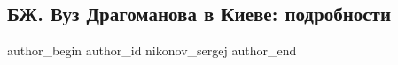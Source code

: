  
 
 
 
 
 
\subsection{БЖ. Вуз Драгоманова в Киеве: подробности}
\label{sec:12_09_2021.fb.nikonov_sergej.1.bilchenko_dragomanova_podrobnosti}
 
\ifcmt
 author_begin
   author_id nikonov_sergej
 author_end
\fi
